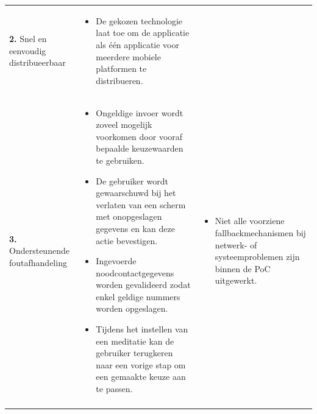 {\begin{longtable}{
            >{\raggedright\arraybackslash}p{5.23cm}
            >{\raggedright\arraybackslash}p{4.93cm}
            >{\raggedright\arraybackslash}p{4.93cm}
        }
        \addlinespace[5pt]
        
        \textbf{2.} Snel en eenvoudig distribueerbaar
        & 
        \begin{itemize}[nosep,leftmargin=*,itemsep=10pt]
            \renewcommand{\labelitemi}{+}
            \item De gekozen technologie laat toe om de applicatie als één applicatie voor meerdere mobiele platformen te distribueren.
        \end{itemize}
        &
        \\
        
        \addlinespace[5pt]
        
        \textbf{3.} Ondersteunende foutafhandeling
        & 
        \begin{itemize}[nosep,leftmargin=*,itemsep=10pt]
            \renewcommand{\labelitemi}{+}
            \item Ongeldige invoer wordt zoveel mogelijk voorkomen door vooraf bepaalde keuzewaarden te gebruiken.
            \item De gebruiker wordt gewaarschuwd bij het verlaten van een scherm met onopgeslagen gegevens en kan deze actie bevestigen.
            \item Ingevoerde noodcontactgegevens worden gevalideerd zodat enkel geldige nummers worden opgeslagen.
            \item Tijdens het instellen van een meditatie kan de gebruiker terugkeren naar een vorige stap om een gemaakte keuze aan te passen.
        \end{itemize}
        & 
        \begin{itemize}[nosep,leftmargin=*,itemsep=10pt]
            \renewcommand{\labelitemi}{-}
            \item Niet alle voorziene fallbackmechanismen bij netwerk- of systeemproblemen zijn binnen de PoC uitgewerkt.
        \end{itemize}
        \\
        
        \addlinespace[5pt]
        

\end{longtable}}
